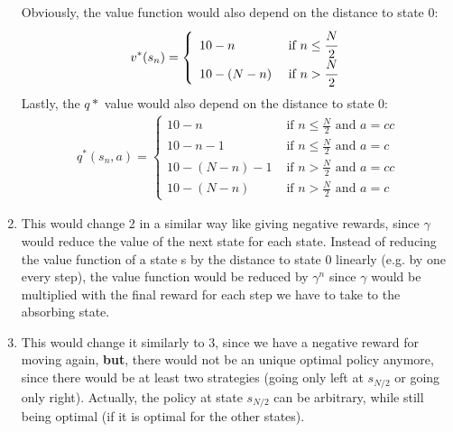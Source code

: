 \begin{enumerate}
    Obviously, the value function would also depend on the distance to state 0:
    \begin{align}
        v^*(s_n)=
        \left\{
            \begin{array}{ll}
                10-n &\mbox{ if }n\leq\cfrac{N}{2}\\
                10-(N-n) &\mbox{ if }n>\cfrac{N}{2}
            \end{array}
        \right.
    \end{align}
    Lastly, the $q*$ value would also depend on the distance to state 0:
    \begin{align}
        q^*(s_n, a)=
        \left\{
            \begin{array}{llll}
                10-n &\mbox{ if }n\leq\frac{N}{2}\mbox{ and } a=cc\\
                10-n-1 &\mbox{ if }n\leq\frac{N}{2}\mbox{ and } a=c\\
                10-(N-n)-1 &\mbox{ if }n>\frac{N}{2}\mbox{ and } a=cc\\
                10-(N-n) &\mbox{ if }n>\frac{N}{2}\mbox{ and } a=c
            \end{array}
        \right.
    \end{align}
    \item This would change 2 in a similar way like giving negative rewards, since $\gamma$ would reduce the 
    value of the next state for each state. Instead of reducing the value function of a state s by the distance to state 0 linearly (e.g. by one every step),
    the value function would be reduced by $\gamma^n$ since $\gamma$ would be multiplied with the final reward for
    each step we have to take to the absorbing state.
    \item This would change it similarly to 3, since we have a negative reward for moving again, \textbf{but}, there would not be an unique optimal policy anymore, since there would be at least two strategies (going only left at $s_{N/2}$ or going only right). Actually, the policy
    at state $s_{N/2}$ can be arbitrary, while still being optimal (if it is optimal for the other states).
\end{enumerate}